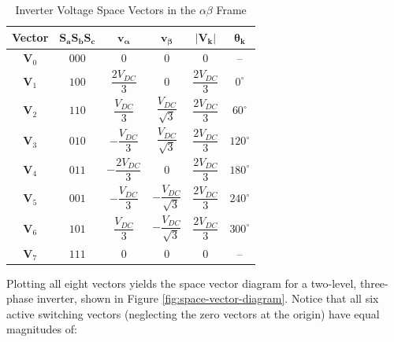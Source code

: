 \documentclass{article}
\begin{document}
\begin{table}[H]
    \centering
    \caption{Inverter Voltage Space Vectors in the $\alpha\beta$ Frame}
    \label{tab:inverter_space_vectors}

    \renewcommand{\arraystretch}{2.3}
    \setlength{\tabcolsep}{12pt}

    \begin{tabular}{c c c c c c}
        \hline
        \textbf{Vector} &
        $\boldsymbol{S_aS_bS_c}$ &
        $\boldsymbol{v_\alpha}$ &
        $\boldsymbol{v_\beta}$ &
        $\boldsymbol{|\mathbf{V}_k|}$ &
        $\boldsymbol{\theta_k}$ \\
        \hline

        $\mathbf{V}_0$ & $000$
        & $0$
        & $0$
        & $0$
        & -- \\

        $\mathbf{V}_1$ & $100$
        & $\dfrac{2V_{DC}}{3}$
        & $0$
        & $\dfrac{2V_{DC}}{3}$
        & $0^\circ$ \\

        $\mathbf{V}_2$ & $110$
        & $\dfrac{V_{DC}}{3}$
        & $\dfrac{V_{DC}}{\sqrt{3}}$
        & $\dfrac{2V_{DC}}{3}$
        & $60^\circ$ \\

        $\mathbf{V}_3$ & $010$
        & $-\dfrac{V_{DC}}{3}$
        & $\dfrac{V_{DC}}{\sqrt{3}}$
        & $\dfrac{2V_{DC}}{3}$
        & $120^\circ$ \\

        $\mathbf{V}_4$ & $011$
        & $-\dfrac{2V_{DC}}{3}$
        & $0$
        & $\dfrac{2V_{DC}}{3}$
        & $180^\circ$ \\

        $\mathbf{V}_5$ & $001$
        & $-\dfrac{V_{DC}}{3}$
        & $-\dfrac{V_{DC}}{\sqrt{3}}$
        & $\dfrac{2V_{DC}}{3}$
        & $240^\circ$ \\

        $\mathbf{V}_6$ & $101$
        & $\dfrac{V_{DC}}{3}$
        & $-\dfrac{V_{DC}}{\sqrt{3}}$
        & $\dfrac{2V_{DC}}{3}$
        & $300^\circ$ \\

        $\mathbf{V}_7$ & $111$
        & $0$
        & $0$
        & $0$
        & -- \\

        \hline
    \end{tabular}
\end{table}

Plotting all eight vectors yields the space vector diagram for a two-level, three-phase inverter, shown in Figure \ref{fig:space-vector-diagram}. Notice that all six active switching vectors (neglecting the zero vectors at the origin) have equal magnitudes of:
\end{document}
